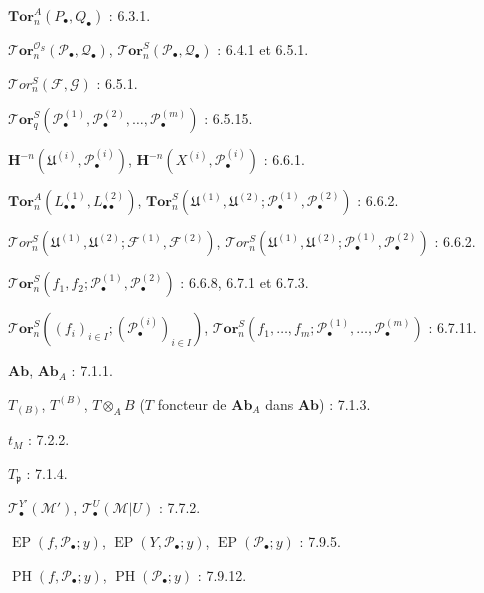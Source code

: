 \begin{flushleft}
$\mathbf{Tor}_n^A(P_\bullet,Q_\bullet)$ : 6.3.1.

\medskip
$\boldsymbol{\mathscr{T}\!or}_n^{\mathscr O_S}(\mathscr P_\bullet,\mathscr Q_\bullet)$,
$\boldsymbol{\mathscr{T}\!or}_n^S(\mathscr P_\bullet,\mathscr Q_\bullet)$ : 6.4.1 et 6.5.1.

\medskip
$\mathscr{T}\!or_n^S(\mathscr F,\mathscr G)$ : 6.5.1.

\medskip
$\boldsymbol{\mathscr{T}\!or}_q^S(\mathscr P_\bullet^{(1)},\mathscr P_\bullet^{(2)},\ldots,
\mathscr P_\bullet^{(m)})$ : 6.5.15.

\medskip
$\mathbf H^{-n}(\mathfrak U^{(i)},\mathscr P_\bullet^{(i)})$,
$\mathbf H^{-n}(X^{(i)},\mathscr P_\bullet^{(i)})$ : 6.6.1.

\medskip
$\mathbf{Tor}_n^A(L_{\bullet\bullet}^{(1)},L_{\bullet\bullet}^{(2)})$,
$\mathbf{Tor}_n^S(\mathfrak U^{(1)},\mathfrak U^{(2)};
\mathscr P_\bullet^{(1)},\mathscr P_\bullet^{(2)})$ : 6.6.2.

\medskip
$\mathscr{T}\!or_n^S(\mathfrak U^{(1)},\mathfrak U^{(2)};
\mathscr F^{(1)},\mathscr F^{(2)})$,
$\mathscr{T}\!or_n^S(\mathfrak U^{(1)},\mathfrak U^{(2)};
\mathscr P_\bullet^{(1)},\mathscr P_\bullet^{(2)})$ : 6.6.2.

\medskip
$\boldsymbol{\mathscr{T}\!or}_n^S(f_1,f_2;\mathscr P_\bullet^{(1)},
\mathscr P_\bullet^{(2)})$ : 6.6.8, 6.7.1 et 6.7.3.

\medskip
$\boldsymbol{\mathscr{T}\!or}_n^S((f_i)_{i\in I};(\mathscr P_\bullet^{(i)})_{i\in I})$,
$\boldsymbol{\mathscr{T}\!or}_n^S(f_1,\ldots,f_m;\mathscr P_\bullet^{(1)},\ldots,
\mathscr P_\bullet^{(m)})$ : 6.7.11.

\medskip
$\boldsymbol{Ab}$, $\boldsymbol{Ab}_A$ : 7.1.1.

\medskip
$T_{(B)}$, $T^{(B)}$, $T\otimes_A B$
($T$ foncteur de $\boldsymbol{Ab}_A$ dans $\boldsymbol{Ab}$) : 7.1.3.

\medskip
$t_M$ : 7.2.2.

\medskip
$T_{\mathfrak p}$ : 7.1.4.

\medskip
$\mathscr T_\bullet^{Y'}(\mathscr M')$,
$\mathscr T_\bullet^U(\mathscr M|U)$ : 7.7.2.

\medskip
$\operatorname{EP}(f,\mathscr P_\bullet;y)$,
$\operatorname{EP}(Y,\mathscr P_\bullet;y)$,
$\operatorname{EP}(\mathscr P_\bullet;y)$ : 7.9.5.

\medskip
$\operatorname{PH}(f,\mathscr P_\bullet;y)$,
$\operatorname{PH}(\mathscr P_\bullet;y)$ : 7.9.12.
\end{flushleft}

